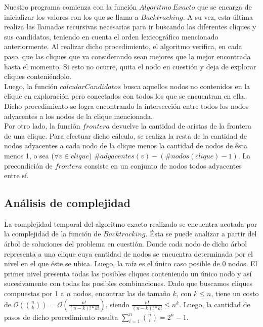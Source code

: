 Nuestro programa comienza con la función $Algoritmo\ Exacto$ que se encarga de inicializar los valores con los que se llama a $Backtracking$. A su vez, esta última realiza las llamadas recursivas necesarias para ir buscando las diferentes cliques y sus candidatos, teniendo en cuenta el orden lexicográfico mencionado anteriormente. Al realizar dicho procedimiento, el algoritmo verifica, en cada paso, que las cliques que va considerando sean mejores que la mejor encontrada hasta el momento. Si esto no ocurre, quita el nodo en cuestión y deja de explorar cliques conteniéndolo.\\
\newline
Luego, la función $calcularCandidatos$ busca aquellos nodos no contenidos en la clique en exploración pero conectados con todos los que se encuentran en ella. Dicho procedimiento se logra encontrando la intersección entre todos los nodos adyacentes a los nodos de la clique mencionada.\\
\newline
Por otro lado, la función $frontera$ devuelve la cantidad de aristas de la frontera de una clique. Para efectuar dicho cálculo, se realiza la resta de la cantidad de nodos adyacentes a cada nodo de la clique menos la cantidad de nodos de ésta menos 1, o sea ($\forall v \in clique$) $\#adyacentes(v)-(\#nodos(clique)-1)$. La precondición de $frontera$ consiste en un conjunto de nodos todos adyacentes entre sí. 

\subsection{Análisis de complejidad}

La complejidad temporal del algoritmo exacto realizado se encuentra acotada por la complejidad de la función de $Backtracking$. Ésta se puede analizar a partir del árbol de soluciones del problema en cuestión. Donde cada nodo de dicho árbol representa a una clique cuya cantidad de nodos se encuentra determinada por el nivel en el que éste se ubica. Luego, la raíz es el único caso posible de 0 nodos. El primer nivel presenta todas las posibles cliques conteniendo un único nodo y así sucesivamente con todas las posibles combinaciones. Dado que buscamos cliques compuestas por 1 a $n$ nodos, encontrar las de tamaño $k$, con $k\leq n$, tiene un costo de $\mathcal{O}({n \choose k})$ = $\mathcal{O}(\frac{n!}{(n-k)!*k!})$, siendo $\frac{n!}{(n-k)!*k!} \leq n^k$. Luego, la cantidad de pasos de dicho procedimiento resulta $\sum\limits_{i=1}^n {n \choose i} = 2^n - 1$. 

